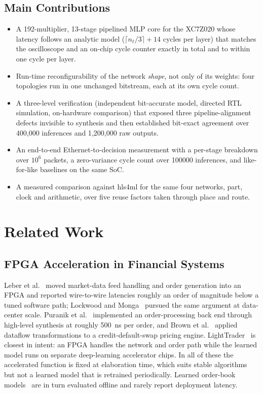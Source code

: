 \documentclass[final,5p,times,twocolumn]{elsarticle}
\begin{document}
\subsection{Main Contributions}
\begin{itemize}
  \item A 192-multiplier, 13-stage pipelined MLP core for the XC7Z020 whose
        latency follows an analytic model ($\lceil n_\ell/3\rceil + 14$ cycles
        per layer) that matches the oscilloscope and an on-chip cycle counter
        exactly in total and to within one cycle per layer.
  \item Run-time reconfigurability of the network \emph{shape}, not only of its
        weights: four topologies run in one unchanged bitstream, each at its own
        cycle count.
  \item A three-level verification (independent bit-accurate model, directed
        RTL simulation, on-hardware comparison) that exposed three
        pipeline-alignment defects invisible to synthesis and then established
        bit-exact agreement over 400{,}000 inferences and 1{,}200{,}000 raw
        outputs.
  \item An end-to-end Ethernet-to-decision measurement with a per-stage
        breakdown over $10^6$ packets, a zero-variance cycle count over
        \num{100000} inferences, and like-for-like baselines on the same SoC.
  \item A measured comparison against hls4ml for the same four networks, part,
        clock and arithmetic, over five reuse factors taken through place and
        route.
\end{itemize}

\section{Related Work}
\subsection{FPGA Acceleration in Financial Systems}
Leber et al.~\cite{Leber2011} moved market-data feed handling and order
generation into an FPGA and reported wire-to-wire latencies roughly an order of
magnitude below a tuned software path; Lockwood and Monga~\cite{Lockwood2015}
pursued the same argument at data-center scale. Puranik et
al.~\cite{Puranik2023} implemented an order-processing back end through
high-level synthesis at roughly \SI{500}{\nano\second} per order, and Brown et
al.~\cite{Brown2021} applied dataflow transformations to a credit-default-swap
pricing engine. LightTrader~\cite{Yoo2023} is closest in intent: an FPGA
handles the network and order path while the learned model runs on separate
deep-learning accelerator chips. In all of these the accelerated function is
fixed at elaboration time, which suits stable algorithms but not a learned model
that is retrained periodically. Learned order-book models~\cite{Zhang2019,
Ntakaris2018} are in turn evaluated offline and rarely report deployment
latency.
\end{document}
